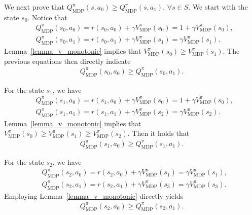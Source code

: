 \begin{myproof}
%
We next prove that $Q_\text{MDP}^{\pi}(s, a_0) \geq Q_\text{MDP}^{\pi}(s, a_1), \, \forall s \in S$. We start with the state $s_0$. Notice that
\begin{align}
    &Q_\text{MDP}^{\pi}(s_0, a_0) = r(s_0, a_0) + \gamma V_\text{MDP}^{\pi}(s_0) = 1+ \gamma V_\text{MDP}^{\pi}(s_0), \\
    &Q_\text{MDP}^{\pi}(s_0, a_1) = r(s_0, a_1) + \gamma V_\text{MDP}^{\pi}(s_1) = \gamma V_\text{MDP}^{\pi}(s_1).
\end{align}
%
Lemma~\ref{lemma_v_monotonic} implies that $V_\text{MDP}^{\pi}(s_0) \geq V_\text{MDP}^{\pi}(s_1)$. The previous equations then directly indicate
\begin{align}
    Q_\text{MDP}^{\pi}(s_0, a_0) \geq Q_\text{MDP}^{\pi}(s_0, a_1).
\end{align}
%

For the state $s_1$, we have
\begin{align}
    &Q_\text{MDP}^{\pi}(s_1, a_0) = r(s_1, a_0) + \gamma V_\text{MDP}^{\pi}(s_0) = 1+ \gamma V_\text{MDP}^{\pi}(s_0), \\
    &Q_\text{MDP}^{\pi}(s_1, a_1) = r(s_1, a_1) + \gamma V_\text{MDP}^{\pi}(s_2) = \gamma V_\text{MDP}^{\pi}(s_2).
\end{align}
Lemma~\ref{lemma_v_monotonic} implies that $V_\text{MDP}^{\pi}(s_0) \geq V_\text{MDP}^{\pi}(s_1) \geq V_\text{MDP}^{\pi}(s_2)$. Then it holds that
\begin{align}
    Q_\text{MDP}^{\pi}(s_1, a_0) \geq Q_\text{MDP}^{\pi}(s_1, a_1).
\end{align}
%

For the state $s_2$, we have
\begin{align}
    &Q_\text{MDP}^{\pi}(s_2, a_0) = r(s_2, a_0) + \gamma V_\text{MDP}^{\pi}(s_1) = \gamma V_\text{MDP}^{\pi}(s_1), \\
    &Q_\text{MDP}^{\pi}(s_2, a_1) = r(s_2, a_1) + \gamma V_\text{MDP}^{\pi}(s_3) = \gamma V_\text{MDP}^{\pi}(s_3).
\end{align}
%
Employing Lemma~\ref{lemma_v_monotonic} directly yields
\begin{align}
    Q_\text{MDP}^{\pi}(s_2, a_0) \geq Q_\text{MDP}^{\pi}(s_2, a_1).
\end{align}
%


\end{myproof}
